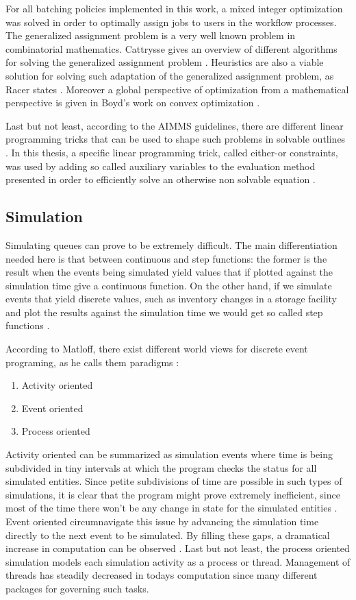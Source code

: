 \documentclass{seal_thesis}
\begin{document}
For all batching policies implemented in this work, a mixed integer optimization was solved in order to optimally assign jobs to users in the workflow processes. The generalized assignment problem is a very well known problem in combinatorial mathematics. Cattrysse gives an overview of different algorithms for solving the generalized assignment problem \cite{Cattrysse1992}. Heuristics are also a viable solution for solving such adaptation of the generalized assignment problem, as Racer states \cite{Racer1994}. Moreover a global perspective of optimization from a mathematical perspective is given in Boyd's work on convex optimization \cite{Boyd2004}.

Last but not least, according to the AIMMS guidelines, there are different linear programming tricks that can be used to shape such problems in solvable outlines \cite{Bisschop2016}. In this thesis, a specific linear programming trick, called either-or constraints, was used by adding so called auxiliary variables to the evaluation method presented in order to efficiently solve an otherwise non solvable equation \cite[p. 77]{Bisschop2016}.

\subsection{Simulation}

Simulating queues can prove to be extremely difficult. The main differentiation needed here is that between continuous and step functions: the former is the result when the events being simulated yield values that if plotted against the simulation time give a continuous function. On the other hand, if we simulate events that yield discrete values, such as inventory changes in a storage facility and plot the results against the simulation time we would get so called step functions \cite{Matloff2008}.

According to Matloff, there exist different world views for discrete event programing, as he calls them paradigms \cite{Matloff2008}:

\begin{enumerate}
	\item Activity oriented
	\item Event oriented
	\item Process oriented
\end{enumerate}

Activity oriented can be summarized as simulation events where time is being subdivided in tiny intervals at which the program checks the status for all simulated entities. Since petite subdivisions of time are possible in such types of simulations, it is clear that the program might prove extremely inefficient, since most of the time there won't be any change in state for the simulated entities \cite{Matloff2008}. Event oriented circumnavigate this issue by advancing the simulation time directly to the next event to be simulated. By filling these gaps, a dramatical increase in computation can be observed \cite{Matloff2008}. Last but not least, the process oriented simulation models each simulation activity as a process or thread. Management of threads has steadily decreased in todays computation since many different packages for governing such tasks.
\end{document}
